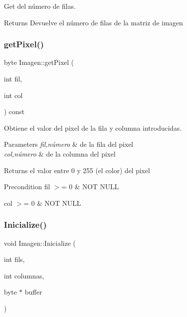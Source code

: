 Get del número de filas. 

\begin{DoxyReturn}{Returns}
Devuelve el número de filas de la matriz de imagen 
\end{DoxyReturn}
\mbox{\label{class_imagen_ab825146bb85e9b86f8bdcc88c71cafae}} 
\subsubsection{\texorpdfstring{get\+Pixel()}{getPixel()}}
{\footnotesize\ttfamily byte Imagen\+::get\+Pixel (\begin{DoxyParamCaption}\item[{int}]{fil,  }\item[{int}]{col }\end{DoxyParamCaption}) const}



Obtiene el valor del pixel de la fila y columna introducidas. 


\begin{DoxyParams}{Parameters}
{\em fil,número} & de la fila del pixel \\
\hline
{\em col,número} & de la columna del pixel \\
\hline
\end{DoxyParams}
\begin{DoxyReturn}{Returns}
el valor entre 0 y 255 (el color) del pixel 
\end{DoxyReturn}
\begin{DoxyPrecond}{Precondition}
fil $>$= 0 \& N\+OT N\+U\+LL 

col $>$= 0 \& N\+OT N\+U\+LL 
\end{DoxyPrecond}
\mbox{\label{class_imagen_a0cbf4969fb5bfdd0ef60cfd390714580}} 
\subsubsection{\texorpdfstring{Inicialize()}{Inicialize()}}
{\footnotesize\ttfamily void Imagen\+::\+Inicialize (\begin{DoxyParamCaption}\item[{int}]{fils,  }\item[{int}]{columnas,  }\item[{byte $\ast$}]{buffer }\end{DoxyParamCaption})}



